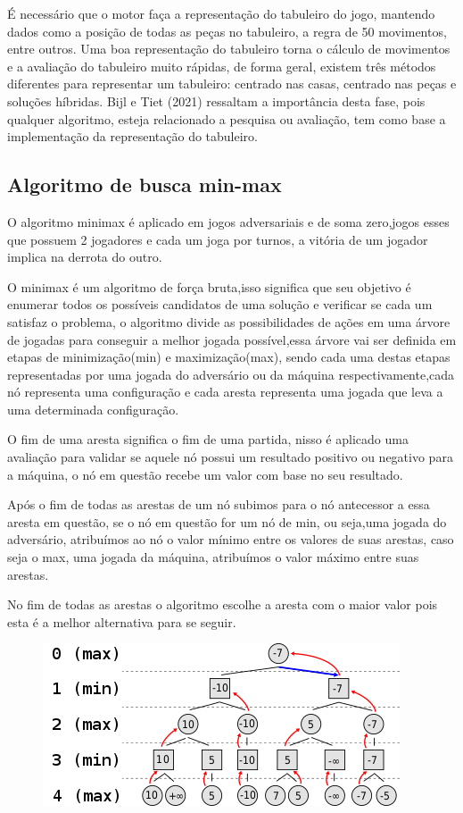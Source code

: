 É necessário que o motor faça a representação do tabuleiro do jogo, mantendo dados como a posição de todas as peças no tabuleiro,
a regra de 50 movimentos, entre outros. Uma boa representação do tabuleiro torna o cálculo de movimentos e a avaliação do tabuleiro
muito rápidas, de forma geral, existem três métodos diferentes para representar um tabuleiro: centrado nas casas, centrado nas peças
e soluções híbridas. Bijl e Tiet (2021) ressaltam a importância desta fase, pois qualquer algoritmo, esteja relacionado a pesquisa
ou avaliação, tem como base a implementação da representação do tabuleiro.


\subsection{Algoritmo de busca min-max}

O algoritmo minimax é aplicado em jogos adversariais e de soma zero,jogos esses que possuem 2 jogadores e cada um joga
por turnos, a vitória de um jogador implica na derrota do outro.

O minimax é um algoritmo de força bruta,isso significa que seu objetivo é enumerar todos os possíveis candidatos de uma
solução e verificar se cada um satisfaz o problema, o algoritmo divide as possibilidades de ações em uma árvore de jogadas
para conseguir a melhor jogada possível,essa árvore vai ser definida em etapas de minimização(min) e maximização(max),
sendo cada uma destas etapas representadas por uma jogada do adversário ou da máquina respectivamente,cada nó representa
uma configuração e cada aresta representa uma jogada que leva a uma determinada configuração.

O fim de uma aresta significa o fim de uma partida, nisso é aplicado uma avaliação para validar se aquele nó possui
um resultado positivo ou negativo para a máquina, o nó em questão recebe um valor com base no seu resultado.

Após o fim de todas as arestas de um nó subimos para o nó antecessor a essa aresta em questão, se o nó em questão for um nó
de min, ou seja,uma jogada do adversário, atribuímos ao nó o valor mínimo entre os valores de suas arestas, caso seja o max,
uma jogada da máquina, atribuímos o valor máximo entre suas arestas.

No fim de todas as arestas o algoritmo escolhe a aresta com o maior valor pois esta é a melhor alternativa para se seguir.

\begin{figure}[!ht]
    \centering
    \label{minimax}
    \includegraphics[scale=0.8]{figuras/minimax2.png}
\end{figure}

